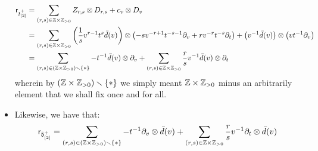 \begin{remark}
\begin{itemize}
                        $$
                            \begin{aligned}
                                \sfr_{\z_{[2]}^+} & = \sum_{(r, s) \in \Z \x \Z_{> 0}} Z_{r, s} \tensor D_{r, s} + c_v \tensor D_v
                                \\
                                & = \sum_{(r, s) \in \Z \x \Z_{> 0}} \left(\frac1s v^{r - 1} t^s \bar{d}(v)\right) \tensor \left(-s v^{-r + 1} t^{-s - 1} \del_v + r v^{-r} t^{-s} \del_t\right) + \left(v^{-1} \bar{d}(v)\right) \tensor \left(v t^{-1} \del_v\right)
                                \\
                                & = \sum_{(r, s) \in (\Z \x \Z_{> 0}) \setminus \{*\}} -t^{-1} \bar{d}(v) \tensor \del_v + \sum_{(r, s) \in \Z \x \Z_{> 0}} \frac{r}{s} v^{-1} \bar{d}(v) \tensor \del_t
                            \end{aligned}
                        $$
                    wherein by $(\Z \x \Z_{> 0}) \setminus \{*\}$ we simply meant $\Z \x \Z_{> 0}$ minus an arbitrarily element that we shall fix once and for all. 
                    \item Likewise, we have that:
                        $$\sfr_{\bar{\d}_{[2]}^+} = \sum_{(r, s) \in (\Z \x \Z_{> 0}) \setminus \{*\}} -t^{-1} \del_v \tensor \bar{d}(v) + \sum_{(r, s) \in \Z \x \Z_{> 0}} \frac{r}{s} v^{-1} \del_t \tensor \bar{d}(v)$$
                \end{itemize}


\end{remark}
